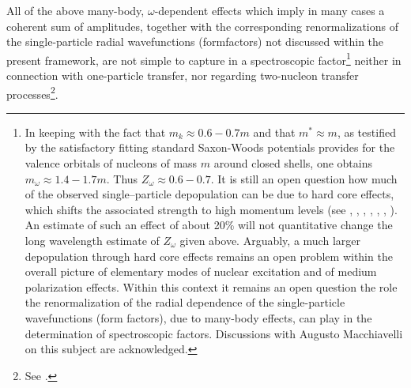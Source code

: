 All of the above many-body, $\omega$-dependent effects which imply in many cases a coherent sum of amplitudes, together with the corresponding renormalizations of the single-particle radial wavefunctions (formfactors) not discussed within the present framework, are not simple to capture in a spectroscopic factor\footnote{In keeping with the fact that $m_k\approx 0.6-0.7 m$ and that $m^*\approx m$, as testified by the satisfactory fitting standard Saxon-Woods potentials provides for the valence orbitals of nucleons of mass $m$ around closed shells, one obtains $m_\omega\approx 1.4-1.7 m$. Thus $Z_\omega \approx 0.6-0.7$. It is still an open question how much of the observed single--particle depopulation can be due to hard core effects, which shifts the associated strength to high momentum levels (see \cite{Dickhoff:05}, \cite{Jenning:11}, \cite{Kramer:01}, \cite{Barbieri:09}, \cite{Schiffer:12}, \cite{Duguet:12}, \cite{Furnstahl:10}).  An estimate of such an effect of about 20\% will not quantitative change the long wavelength estimate of $Z_\omega$ given above. Arguably, a much larger depopulation through hard core effects remains an open problem within the overall picture of elementary modes of nuclear excitation and of medium polarization effects. Within this context it remains an open question  the role   the renormalization of the radial dependence of the single-particle wavefunctions (form factors), due to many-body effects, can play in the determination of spectroscopic factors. Discussions with Augusto Macchiavelli on this subject are  acknowledged.} neither in connection with one-particle transfer, nor regarding two-nucleon transfer processes\footnote{See \cite{Barranco:05,Barranco:99}.}. 






